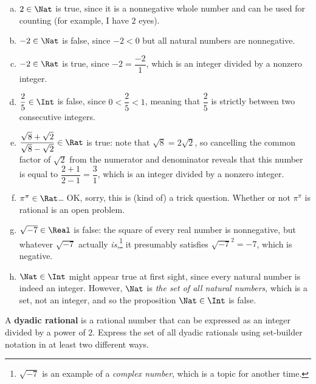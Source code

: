 \begin{solutions*}
  \fixlistskip
\begin{enumerate}[(a)]
\item $2 \in \Nat$ is true, since it is a nonnegative whole number and can be used for counting (for example, I have $2$ eyes).
\item $-2 \in \Nat$ is false, since $-2 < 0$ but all natural numbers are nonnegative.
\item $-2 \in \Rat$ is true, since $-2 = \dfrac{-2}{1}$, which is an integer divided by a nonzero integer.
\item $\dfrac{2}{5} \in \Int$ is false, since $0<\dfrac{2}{5}<1$, meaning that $\dfrac{2}{5}$ is strictly between two consecutive integers.
\item $\dfrac{\sqrt{8}+\sqrt{2}}{\sqrt{8}-\sqrt{2}} \in \Rat$ is true: note that $\sqrt{8} = 2\sqrt{2}$, so cancelling the common factor of $\sqrt{2}$ from the numerator and denominator reveals that this number is equal to $\dfrac{2+1}{2-1} = \dfrac{3}{1}$, which is an integer divided by a nonzero integer.
\item $\pi^{\pi} \in \Rat$\dots{} OK, sorry, this is (kind of) a trick question. Whether or not $\pi^{\pi}$ is rational is an open problem.
\item $\sqrt{-7} \in \Real$ is false: the square of every real number is nonnegative, but whatever $\sqrt{-7}$ actually \textit{is},\footnote{$\sqrt{-7}$ is an example of a \textit{complex number}, which is a topic for another time.} it presumably satisfies $\sqrt{-7}^2=-7$, which is negative.
\item $\Nat \in \Int$ might appear true at first sight, since every natural number is indeed an integer. However, $\Nat$ is \textit{the set of all natural numbers}, which is a set, not an integer, and so the proposition $\Nat \in \Int$ is false.
\end{enumerate}
\end{solutions*}

\begin{exercise}
\label{exDyadicRatioal}
A \textbf{dyadic rational} is a rational number that can be expressed as an integer divided by a power of $2$. Express the set of all dyadic rationals using set-builder notation in at least two different ways.
\end{exercise}

